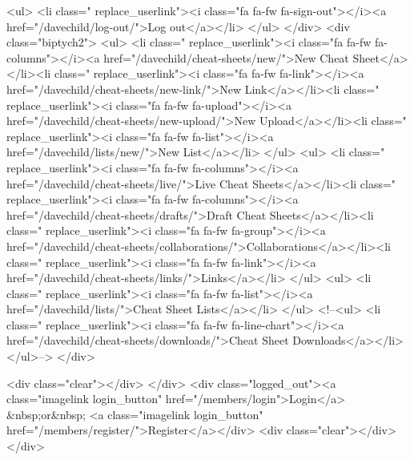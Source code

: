                         <ul>
                            <li class=" replace_userlink"><i class="fa fa-fw fa-sign-out"></i><a href="/davechild/log-out/">Log out</a></li>                        </ul>
                    </div>
                    <div class="biptych2">
                        <ul>
                            <li class=" replace_userlink"><i class="fa fa-fw fa-columns"></i><a href="/davechild/cheat-sheets/new/">New Cheat Sheet</a></li><li class=" replace_userlink"><i class="fa fa-fw fa-link"></i><a href="/davechild/cheat-sheets/new-link/">New Link</a></li><li class=" replace_userlink"><i class="fa fa-fw fa-upload"></i><a href="/davechild/cheat-sheets/new-upload/">New Upload</a></li><li class=" replace_userlink"><i class="fa fa-fw fa-list"></i><a href="/davechild/lists/new/">New List</a></li>                        </ul>
                        <ul>
                            <li class=" replace_userlink"><i class="fa fa-fw fa-columns"></i><a href="/davechild/cheat-sheets/live/">Live Cheat Sheets</a></li><li class=" replace_userlink"><i class="fa fa-fw fa-columns"></i><a href="/davechild/cheat-sheets/drafts/">Draft Cheat Sheets</a></li><li class=" replace_userlink"><i class="fa fa-fw fa-group"></i><a href="/davechild/cheat-sheets/collaborations/">Collaborations</a></li><li class=" replace_userlink"><i class="fa fa-fw fa-link"></i><a href="/davechild/cheat-sheets/links/">Links</a></li>                        </ul>
                        <ul>
                            <li class=" replace_userlink"><i class="fa fa-fw fa-list"></i><a href="/davechild/lists/">Cheat Sheet Lists</a></li>                        </ul>
                        <!--<ul>
                            <li class=" replace_userlink"><i class="fa fa-fw fa-line-chart"></i><a href="/davechild/cheat-sheets/downloads/">Cheat Sheet Downloads</a></li>                        </ul>-->
                    </div>

                    <div class="clear"></div>
                </div>
                <div class="logged_out"><a class="imagelink login_button" href="/members/login">Login</a> &nbsp;or&nbsp; <a class="imagelink login_button" href="/members/register/">Register</a></div>
                <div class="clear"></div>
            </div>

